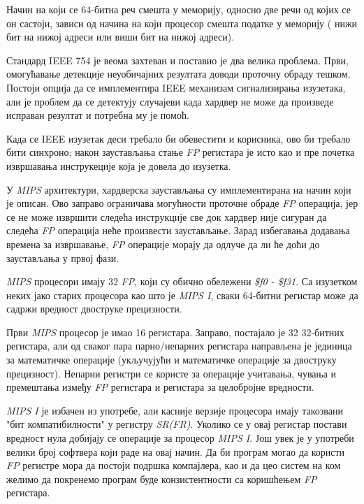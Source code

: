 \documentclass[12pt,oneside]{memoir}
\begin{document}
\indent Начин на који се 64-битна реч смешта у меморију, односно две речи од којих се он састоји, зависи од начина на који процесор смешта податке у меморију ( нижи бит на нижој адреси или виши бит на нижој адреси). 

\indent Стандард IEEE 754 је веома захтеван и поставио је два велика проблема. Први, омогућавање детекције неуобичајних резултата доводи проточну обраду тешком. Постоји опција да се имплементира IEEE механизам сигнализирања изузетака, али је проблем да се детектују случајеви када хардвер не може да произведе исправан резултат и потребна му је помоћ.

\indent Када се IEEE изузетак деси требало би обевестити и корисника, ово би требало бити синхроно; након заустављања стање \textit{FP} регистара је исто као и пре почетка извршавања инструкеције која је довела до изузетка.

\indent У \textit{MIPS} архитектури, хардверска заустављања су имплементирана на начин који је описан. Ово заправо ограничава могућности проточне обраде \textit{FP} операција, јер се не може извршити следећа инструкције све док хардвер није сигуран да следећа \textit{FP} операција неће произвести заустављање. Зарад избегавања додавања времена за извршавање, \textit{FP} операције морају да одлуче да ли ће доћи до заустављања у првој фази. 

\indent \textit{MIPS} процесори имају 32 \textit{FP}, који су обично обележени \textit{\$f0 - \$f31}. Са изузетком неких јако старих процесора као што је \textit{MIPS I}, сваки 64-битни регистар може да садржи вредност двоструке прецизности.

\indent Први \textit{MIPS} процесор је имао 16 регистара. Заправо, постајало је 32 32-битних регистара, али од сваког пара парно/непарних регистара направљена је јединица за математичке операције (укључујући и математичке операције за двоструку прецизност). Непарни регистри се користе за операције учитавања, чувања и премештања између \textit{FP} регистара и регистара за целобројне вредности.

\indent \textit{MIPS I} је избачен из употребе, али касније верзије процесора имају такозвани "бит компатибилности" у регистру \textit{SR(FR)}. Уколико се у овај регистар постави вредност нула добијају се операције за процесор \textit{MIPS I}. Још увек је у употреби велики број софтвера који раде на овај начин. Да би програм могао да користи \textit{FP} регистре мора да постоји подршка компајлера, као и да цео систем на ком желимо да покренемо програм буде конзистентности са коришћењем \textit{FP} регистара.
\end{document}
